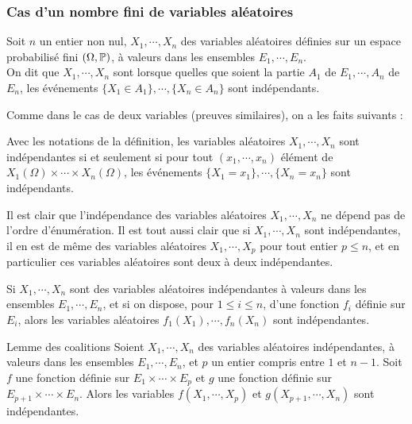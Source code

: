 \documentclass[12pt,a4paper]{report}
\begin{document}
\subsubsection{Cas d'un nombre fini de variables aléatoires}

\begin{definition}{}{}
Soit $n$ un entier non nul, $X_1,\cdots,X_n$ des variables aléatoires définies sur un espace probabilisé fini $(\Omega, \mathbb{P})$, à valeurs dans les ensembles $E_1,\cdots,E_n$. \\

On dit que $X_1 , \cdots, X_n$ sont  lorsque quelles que soient la partie $A_1$ de $E_1, \cdots, A_n$ de $E_n$, les événements $\{X_1 \in A_1\}, \cdots, \{X_n \in A_n\}$ sont indépendants.
\end{definition}

Comme dans le cas de deux variables (preuves similaires), on a les faits suivants :

\begin{proposition}{}{}
Avec les notations de la définition, les variables aléatoires $X_1,\cdots,X_n$ sont indépendantes si et seulement si pour tout $(x_1,\cdots,x_n)$ élément de $X_1(\Omega) \times \cdots \times X_n(\Omega)$, les événements $\{X_1=x_1\}, \cdots, \{X_n = x_n\}$ sont indépendants.
\end{proposition}

\begin{remarque}{}
Il est clair que l'indépendance des variables aléatoires $X_1,\cdots,X_n$ ne dépend pas de l'ordre d'énumération. Il est tout aussi clair que si $X_1,\cdots,X_n$ sont indépendantes, il en est de même des variables aléatoires $X_1,\cdots,X_p$ pour tout entier $p \le n$, et en particulier ces variables aléatoires sont deux à deux indépendantes.
\end{remarque}

\begin{proposition}{}{}
Si $X_1,\cdots,X_n$ sont des variables aléatoires indépendantes à valeurs dans les ensembles $E_1,\cdots,E_n$, et si on dispose, pour $1 \le i \le n$, d'une fonction $f_i$ définie sur $E_i$, alors les variables aléatoires $f_1(X_1), \cdots,f_n(X_n)$ sont indépendantes.
\end{proposition}

\begin{theoreme}{Lemme des coalitions}{}
Soient $X_1,\cdots,X_n$ des variables aléatoires indépendantes, à valeurs dans les ensembles $E_1,\cdots,E_n$, et $p$ un entier compris entre $1$ et $n-1$. Soit $f$ une fonction définie sur $E_1\times \cdots \times E_p$ et $g$ une fonction définie sur $E_{p+1}\times \cdots\times E_n$. Alors les variables $f(X_1,\cdots,X_p)$ et $g(X_{p+1},\cdots,X_n)$ sont indépendantes.
\end{theoreme}
\end{document}
